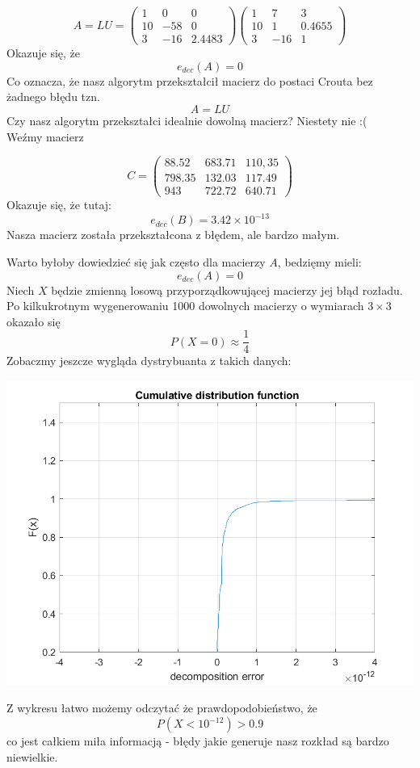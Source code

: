 \documentclass{article}\usepackage{amsmath,amsfonts,amssymb}
\begin{document}
\begin{equation}
A = LU = 
\begin{pmatrix}
  1 & 0 &  0 \\
  10 & -58 &  0 \\
  3 & -16 & 2.4483 
 \end{pmatrix} 
 \begin{pmatrix}
  1 & 7 &  3 \\
  10 & 1 &  0.4655 \\
  3 & -16 & 1 
 \end{pmatrix} 
 
 \end{equation}
 Okazuje się, że 
 \[e_{dec}(A) = 0 \]
 Co oznacza, że nasz algorytm przekształcił macierz  do postaci Crouta bez żadnego błędu tzn.
 \[ A = LU\]
 Czy nasz algorytm przekształci idealnie dowolną macierz? Niestety nie :( \\
 Weźmy macierz 
 
 \begin{equation}
C =  
\begin{pmatrix}
  88.52 & 683.71 &  110,35 \\
  798.35 & 132.03 &  117.49 \\
  943 & 722.72 & 640.71 
 \end{pmatrix} 
 \end{equation}
 Okazuje się, że tutaj:
  \[e_{dec}(B) = 3.42 \times 10^{-13} \]
 Nasza macierz została przekształcona z błędem, ale bardzo małym.
 
 Warto byłoby dowiedzieć się jak często dla macierzy $A$, bedzięmy mieli:
   \[e_{dec}(A) = 0 \]
 Niech $X$ będzie zmienną losową przyporządkowującej macierzy jej błąd rozładu. Po kilkukrotnym wygenerowaniu 1000 dowolnych macierzy o wymiarach  $3 \times 3$ okazało się 
 \[ P(X = 0) \approx \frac{1}{4} \]
 Zobaczmy jeszcze wygląda dystrybuanta z takich danych:
 \begin{center}
   \includegraphics[scale=1]{Cumulative_distribution.png}
\end{center}
Z wykresu łatwo możemy odczytać że prawdopodobieństwo, że 
\[P(X <10^{-12}) > 0.9\] 
co jest całkiem miła informacją - błędy jakie generuje nasz rozkład są bardzo niewielkie.
\end{document}
